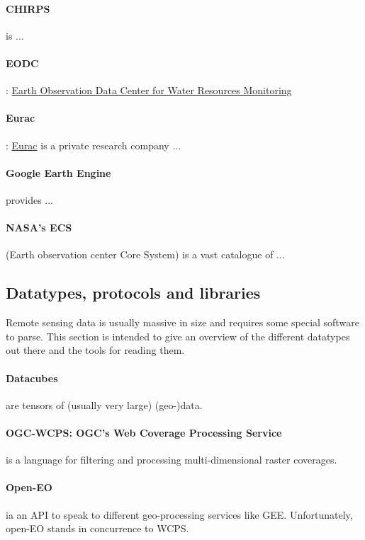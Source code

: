 \paragraph{CHIRPS} is ...

\paragraph{EODC}: \href{https://www.eodc.eu/}{Earth Observation Data Center for Water Resources Monitoring}

\paragraph{Eurac}: \href{http://www.eurac.edu}{Eurac} is a private research company ...

\paragraph{Google Earth Engine} provides ...

\paragraph{NASA's ECS} (Earth observation center Core System) is a vast catalogue of ...



\subsection{Datatypes, protocols and libraries}

Remote sensing data is usually massive in size and requires some special software to parse. This section is intended to give an overview of the different datatypes out there and the tools for reading them. 

\paragraph{Datacubes} are tensors of (usually very large) (geo-)data.

\paragraph{OGC-WCPS: OGC's Web Coverage Processing Service} is a language for filtering and processing multi-dimensional raster coverages. 

\paragraph{Open-EO} ia an API to speak to different geo-processing services like GEE. Unfortunately, open-EO stands in concurrence to WCPS. 

